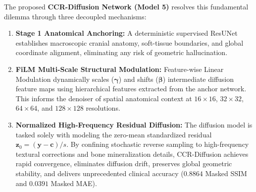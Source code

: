 The proposed \textbf{CCR-Diffusion Network (Model 5)} resolves this fundamental dilemma through three decoupled mechanisms:
\begin{enumerate}
    \item \textbf{Stage 1 Anatomical Anchoring:} A deterministic supervised ResUNet establishes macroscopic cranial anatomy, soft-tissue boundaries, and global coordinate alignment, eliminating any risk of geometric hallucination.
    \item \textbf{FiLM Multi-Scale Structural Modulation:} Feature-wise Linear Modulation dynamically scales ($\boldsymbol{\gamma}$) and shifts ($\boldsymbol{\beta}$) intermediate diffusion feature maps using hierarchical features extracted from the anchor network. This informs the denoiser of spatial anatomical context at $16\times 16$, $32\times 32$, $64\times 64$, and $128\times 128$ resolutions.
    \item \textbf{Normalized High-Frequency Residual Diffusion:} The diffusion model is tasked solely with modeling the zero-mean standardized residual $\mathbf{z}_0 = (\mathbf{y} - \mathbf{c}) / s$. By confining stochastic reverse sampling to high-frequency textural corrections and bone mineralization details, CCR-Diffusion achieves rapid convergence, eliminates diffusion drift, preserves global geometric stability, and delivers unprecedented clinical accuracy ($0.8864$ Masked SSIM and $0.0391$ Masked MAE).
\end{enumerate}
